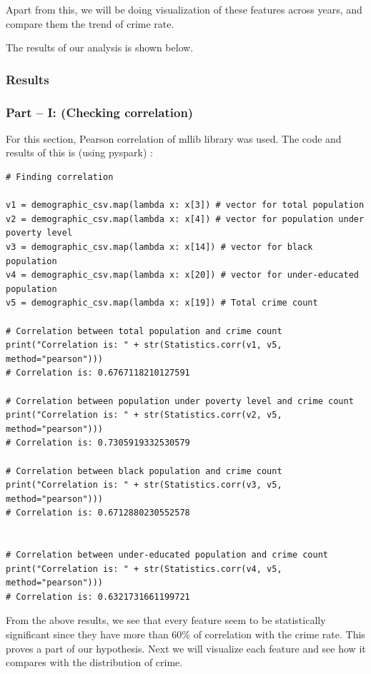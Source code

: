 \documentclass{article}
\begin{document}
Apart from this, we will be doing visualization of these features across years, and compare them the trend of crime rate. 

The results of our analysis is shown below.

\subsubsection{Results}
\subsubsection*{Part – I: (Checking correlation)}

For this section, Pearson correlation of mllib library was used. The code and results of this is (using pyspark) :

\begin{verbatim}
# Finding correlation

v1 = demographic_csv.map(lambda x: x[3]) # vector for total population
v2 = demographic_csv.map(lambda x: x[4]) # vector for population under poverty level
v3 = demographic_csv.map(lambda x: x[14]) # vector for black population
v4 = demographic_csv.map(lambda x: x[20]) # vector for under-educated population
v5 = demographic_csv.map(lambda x: x[19]) # Total crime count

# Correlation between total population and crime count
print("Correlation is: " + str(Statistics.corr(v1, v5, method="pearson")))
# Correlation is: 0.6767118210127591

# Correlation between population under poverty level and crime count
print("Correlation is: " + str(Statistics.corr(v2, v5, method="pearson")))
# Correlation is: 0.7305919332530579

# Correlation between black population and crime count
print("Correlation is: " + str(Statistics.corr(v3, v5, method="pearson")))
# Correlation is: 0.6712880230552578


# Correlation between under-educated population and crime count
print("Correlation is: " + str(Statistics.corr(v4, v5, method="pearson")))
# Correlation is: 0.6321731661199721
\end{verbatim}

From the above results, we see that every feature seem to be statistically significant since they have more than 60\% of correlation with the crime rate. This proves a part of our hypothesis. Next we will visualize each feature and see how it compares with the distribution of crime.
\end{document}

